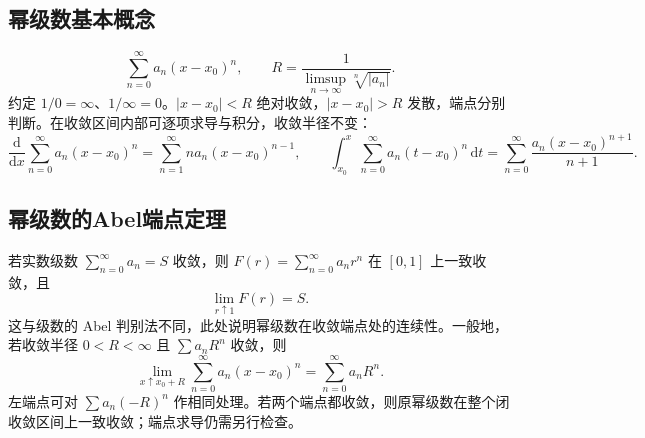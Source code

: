 \documentclass[../main.tex]{subfiles}
\begin{document}
\subsection{幂级数基本概念}
\[
\sum_{n=0}^\infty a_n(x-x_0)^n,\qquad
R=\frac1{\limsup_{n\to\infty}\sqrt[n]{|a_n|}}.
\]
约定 $1/0=\infty$、$1/\infty=0$。$|x-x_0|<R$ 绝对收敛，$|x-x_0|>R$ 发散，端点分别判断。在收敛区间内部可逐项求导与积分，收敛半径不变：
\[
\frac{\mathrm d}{\mathrm dx}\sum_{n=0}^\infty a_n(x-x_0)^n
=\sum_{n=1}^\infty na_n(x-x_0)^{n-1},\qquad
\int_{x_0}^x\sum_{n=0}^\infty a_n(t-x_0)^n\,\mathrm dt
=\sum_{n=0}^\infty\frac{a_n(x-x_0)^{n+1}}{n+1}.
\]
\subsection{幂级数的Abel端点定理}
若实数级数 $\sum_{n=0}^\infty a_n=S$ 收敛，则 $F(r)=\sum_{n=0}^\infty a_nr^n$ 在 $[0,1]$ 上一致收敛，且
\[
\lim_{r\uparrow1}F(r)=S.
\]
这与级数的 Abel 判别法不同，此处说明幂级数在收敛端点处的连续性。一般地，若收敛半径 $0<R<\infty$ 且 $\sum a_nR^n$ 收敛，则
\[
\lim_{x\uparrow x_0+R}\sum_{n=0}^\infty a_n(x-x_0)^n
=\sum_{n=0}^\infty a_nR^n.
\]
左端点可对 $\sum a_n(-R)^n$ 作相同处理。若两个端点都收敛，则原幂级数在整个闭收敛区间上一致收敛；端点求导仍需另行检查。
\end{document}
